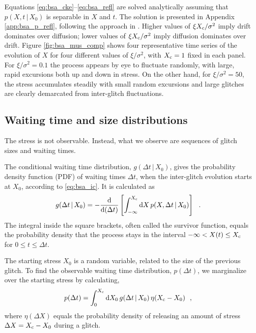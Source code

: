Equations \eqref{eq:bsa_cke}--\eqref{eq:bsa_refl} are solved analytically assuming that $p(X, t \,|\, X_0)$ is separable in $X$ and $t$. The solution is presented in Appendix \ref{app:bsa_p_refl}, following the approach in \citet{Sweet1970}. Higher values of $\xi X_\textrm{c}/\sigma^2$ imply drift dominates over diffusion; lower values of $\xi X_\textrm{c}/\sigma^2$ imply diffusion dominates over drift. Figure \ref{fig:bsa_mus_comp} shows four representative time series of the evolution of $X$ for four different values of $\xi/\sigma^2$, with $X_\textrm{c}=1$ fixed in each panel. For $\xi / \sigma^2 = 0.1$ the process appears by eye to fluctuate randomly, with large, rapid excursions both up and down in stress. On the other hand, for $\xi / \sigma^2 = 50$, the stress accumulates steadily with small random excursions and large glitches are clearly demarcated from inter-glitch fluctuations.

\subsection{Waiting time and size distributions}
\label{sec:bsa_dist}
The stress is not observable. Instead, what we observe are sequences of glitch sizes and waiting times. 

The conditional waiting time distribution, $g(\Delta t \,|\, X_0)$, gives the probability density function (PDF) of waiting times $\Delta t$, when the inter-glitch evolution starts at $X_0$, according to \eqref{eq:bsa_ic}. It is calculated as \citep{Cox1965}
\begin{equation}
\label{eq:bsa_gderiv}
g(\Delta t \,|\, X_0) = -\frac{\td}{\td (\Delta t)} \left[\int_{-\infty}^{\xc}\td X\,  p(X, \Delta t \,|\, X_0) \right]\ \ .
\end{equation}
The integral inside the square brackets, often called the survivor function, equals the probability density that the process stays in the interval $-\infty < X(t) \leq X_\textrm{c}$ for $0 \leq t \leq \Delta t$.

The starting stress $X_0$ is a random variable, related to the size of the previous glitch. To find the observable waiting time distribution, $p(\Delta t)$, we marginalize over the starting stress by calculating,
\begin{equation}
\label{eq:bsa_pdelt}
p(\Delta t) = \int_0^{X_\textrm{c}} \textrm{d} X_0\, g(\Delta t \,|\, X_0)\, \eta(X_\textrm{c} - X_0)\ \ ,
\end{equation}
where $\eta(\Delta X)$ equals the probability density of releasing an amount of stress $\Delta X = X_\textrm{c} - X_0$ during a glitch.

